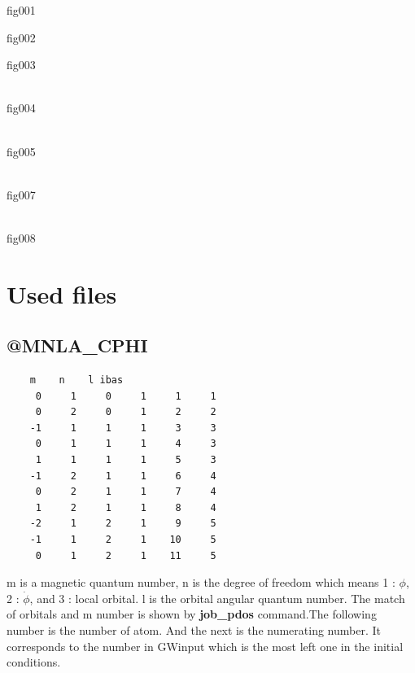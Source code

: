 
fig001


fig002


fig003


\\
fig004

\\
fig005

\\
fig007

\\
fig008


\newpage
\section{Used files} 
\subsection{@MNLA\_CPHI}
\begin{verbatim}
    m    n    l ibas
     0     1     0     1     1     1
     0     2     0     1     2     2
    -1     1     1     1     3     3
     0     1     1     1     4     3
     1     1     1     1     5     3
    -1     2     1     1     6     4
     0     2     1     1     7     4
     1     2     1     1     8     4
    -2     1     2     1     9     5
    -1     1     2     1    10     5
     0     1     2     1    11     5
\end{verbatim}
m is a magnetic quantum number, n is the degree of freedom which means 1 : $\phi$, 2 : $\dot{\phi}$, and 3 : local orbital. l is the orbital angular quantum number. The match of orbitals and m number is shown by {\bf job\_pdos} command.The following number is the number of atom. And the next is the numerating number. It corresponds to the number in GWinput which is the most left one in the initial conditions.
